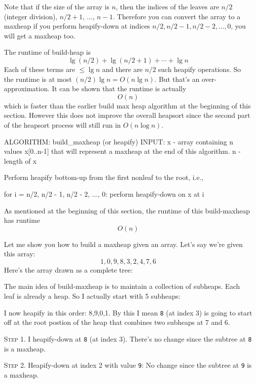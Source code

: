 Note that if the size of the array is $n$,
then the indices of the leaves are
$n/2$ (integer division), $n/2 + 1$, ..., $n - 1$.
Therefore you can convert the array to a maxheap
if you perform heapify-down at indices
$n/2, n/2-1, n/2-2,...,0$, you will get a maxheap too.

The runtime of build-heap is
\[
  \lg (n/2) + \lg (n/2 + 1) + \cdots + \lg n
\]
Each of these terms are $\leq \lg n$ and there are $n/2$
such heapify operations.
So the runtime is at most $(n/2) \lg n = O(n \lg n)$.
But that's an over-approximation.
It can be shown that the runtime is actually
\[
O(n)
\]
which is faster than the earlier build max heap algorithm
at the beginning of this section.
However this does not improve the overall heapsort
since the second part of the heapsort process will still run
in $O(n \log n)$.

\begin{console}
ALGORITHM: build_maxheap (or heapify)
INPUT: x - array containing n values x[0..n-1] that will
           represent a maxheap at the end of this
           algorithm.
       n - length of x

Perform heapify bottom-up from the first nonleaf to the
root, i.e.,

for i = n/2, n/2 - 1, n/2 - 2, ..., 0:
    perform heapify-down on x at i
\end{console}

As mentioned at the beginning of this section, the runtime of
this build-maxheap has runtime
\[
O(n)
\]

Let me show you how to 
build a maxheap given an array.
Let's say we're given this array:
\[
1, 0, 9, 8, 3, 2, 4, 7, 6
\]
Here's the array drawn as a complete tree:



The main idea of build-maxheap
is to maintain a collection of subheaps.
Each leaf is already a heap.
So I actually start with 5 subheaps:



I now heapify in this order: 8,9,0,1.
By this I mean \verb!8! (at index 3) is going to start off at the
root postion of the heap that combines two subheaps at 7 and 6.


\textsc{Step 1.}
I heapify-down at \texttt{8} (at index 3).
There's no change since the
subtree at \texttt{8} is a maxheap.




\textsc{Step 2.}
Heapify-down at index 2 with value \texttt{9}:
No change since the subtree at \texttt{9} is a maxheap.


